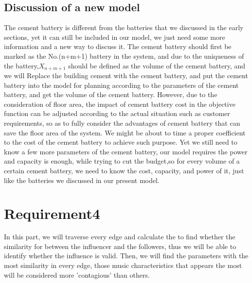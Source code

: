 \documentclass[UTF-8]{article}
\begin{document}
    \subsection{Discussion of a new model}
    The cement battery is different from the batteries that we discussed in the early sections, yet it can still be included in our model, we just need  some more information and a new way to discuss it.
    The cement battery should first be marked as the No.(n+m+1) battery in the system, and due to the uniqueness of the battery,$X_{n+m+1}$ should be defined as the volume of the cement battery, and we will Replace the building cement with the cement battery, and 
    put the cement battery into the model for planning according to the parameters of the cement battery, and get the volume of the cement battery. However, due to the consideration of 
    floor area, the impact of cement battery cost in the objective function can be adjusted according to the actual situation such as customer requirements, so as to fully consider the advantages of 
    cement battery that can save the floor area of the system. We might be about to time a proper coefficient to the cost of the cement battery to achieve such purpose. Yet we still need to know a few more parameters of the cement battery, our model requires the power and capacity is enough, while trying to cut the budget,so for every volume of a certain cement battery, we need to know the cost, capacity, and power of it,
    just like the batteries we discussed in our present model.
    \newpage \section{Requirement4}\Large
     In this part, we will traverse every edge and calculate the to find whether the similarity for between the influencer and the followers, thus we will be able to identify whether the influence is valid.
     Then, we will find the parameters with the most similarity in every edge, those music characteristics that appears the most will be considered more
     'contagious' than others.
\end{document}

